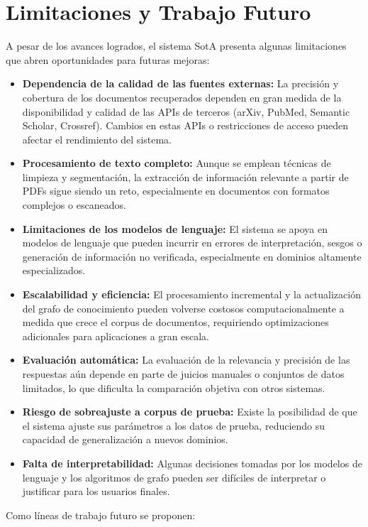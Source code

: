 \documentclass[12pt]{article}
\begin{document}
\section{Limitaciones y Trabajo Futuro}
A pesar de los avances logrados, el sistema SotA presenta algunas limitaciones que abren oportunidades para futuras mejoras:
\begin{itemize}
\item \textbf{Dependencia de la calidad de las fuentes externas:} La precisión y cobertura de los documentos recuperados dependen en gran medida de la disponibilidad y calidad de las APIs de terceros (arXiv, PubMed, Semantic Scholar, Crossref). Cambios en estas APIs o restricciones de acceso pueden afectar el rendimiento del sistema.
\item \textbf{Procesamiento de texto completo:} Aunque se emplean técnicas de limpieza y segmentación, la extracción de información relevante a partir de PDFs sigue siendo un reto, especialmente en documentos con formatos complejos o escaneados.
\item \textbf{Limitaciones de los modelos de lenguaje:} El sistema se apoya en modelos de lenguaje que pueden incurrir en errores de interpretación, sesgos o generación de información no verificada, especialmente en dominios altamente especializados.
\item \textbf{Escalabilidad y eficiencia:} El procesamiento incremental y la actualización del grafo de conocimiento pueden volverse costosos computacionalmente a medida que crece el corpus de documentos, requiriendo optimizaciones adicionales para aplicaciones a gran escala.
\item \textbf{Evaluación automática:} La evaluación de la relevancia y precisión de las respuestas aún depende en parte de juicios manuales o conjuntos de datos limitados, lo que dificulta la comparación objetiva con otros sistemas.
\item \textbf{Riesgo de sobreajuste a corpus de prueba:} Existe la posibilidad de que el sistema ajuste sus parámetros a los datos de prueba, reduciendo su capacidad de generalización a nuevos dominios.
\item \textbf{Falta de interpretabilidad:} Algunas decisiones tomadas por los modelos de lenguaje y los algoritmos de grafo pueden ser difíciles de interpretar o justificar para los usuarios finales.
\end{itemize}

Como líneas de trabajo futuro se proponen:
\end{document}

